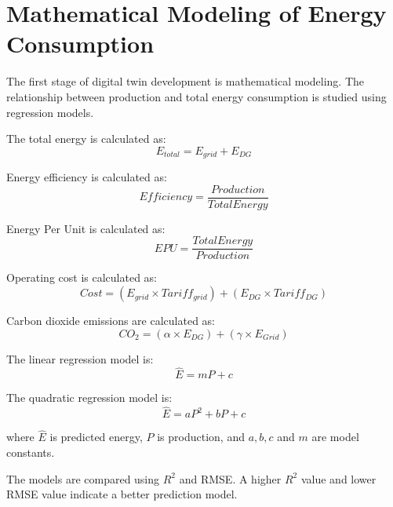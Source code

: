 \section{Mathematical Modeling of Energy Consumption}
The first stage of digital twin development is mathematical modeling. The relationship between production and total energy consumption is studied using regression models.

The total energy is calculated as:
\begin{equation}
E_{total} = E_{grid} + E_{DG}
\end{equation}

Energy efficiency is calculated as:
\begin{equation}
Efficiency = \frac{Production}{Total Energy}
\end{equation}

Energy Per Unit is calculated as:
\begin{equation}
EPU = \frac{Total Energy}{Production}
\end{equation}

Operating cost is calculated as:
\begin{equation}
Cost = (E_{grid} \times Tariff_{grid}) + (E_{DG} \times Tariff_{DG})
\end{equation}

Carbon dioxide emissions are calculated as:
\begin{equation}
CO_2 = (\alpha \times E_{DG}) + (\gamma \times E_{Grid})
\end{equation}

The linear regression model is:
\begin{equation}
\hat{E} = mP + c
\end{equation}

The quadratic regression model is:
\begin{equation}
\hat{E} = aP^2 + bP + c
\end{equation}

where $\hat{E}$ is predicted energy, $P$ is production, and $a, b, c$ and $m$ are model constants.

The models are compared using $R^2$ and RMSE. A higher $R^2$ value and lower RMSE value indicate a better prediction model.


